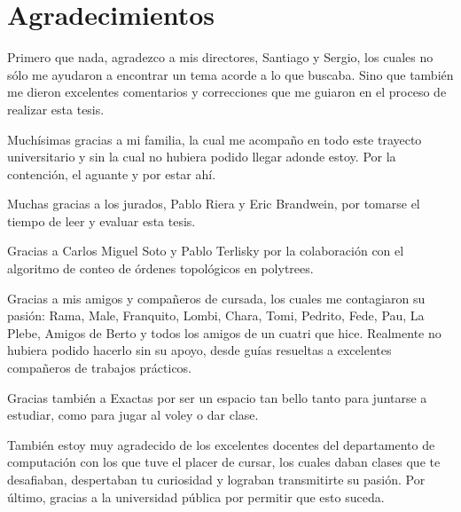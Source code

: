 \section*{Agradecimientos}

Primero que nada, agradezco a mis directores, Santiago y Sergio, los cuales no sólo me ayudaron a encontrar un tema acorde a lo que buscaba. Sino que también me dieron excelentes comentarios y correcciones que me guiaron en el proceso de realizar esta tesis. 

Muchísimas gracias a mi familia, la cual me acompaño en todo este trayecto universitario y sin la cual no hubiera podido llegar adonde estoy. Por la contención, el aguante y por estar ahí.

Muchas gracias a los jurados, Pablo Riera y Eric Brandwein, por tomarse el tiempo de leer y evaluar esta tesis. 

Gracias a Carlos Miguel Soto y Pablo Terlisky por la colaboración con el algoritmo de conteo de órdenes topológicos en polytrees. 

Gracias a mis amigos y compañeros de cursada, los cuales me contagiaron su pasión: Rama, Male, Franquito, Lombi, Chara, Tomi, Pedrito, Fede, Pau, La Plebe, Amigos de Berto y todos los amigos de un cuatri que hice. Realmente no hubiera podido hacerlo sin su apoyo, desde guías resueltas a excelentes compañeros de trabajos prácticos. 

Gracias también a Exactas por ser un espacio tan bello tanto para juntarse a estudiar, como para jugar al voley o dar clase. 

También estoy muy agradecido de los excelentes docentes del departamento de computación con los que tuve el placer de cursar,  los cuales daban clases que te desafiaban, despertaban tu curiosidad y  lograban transmitirte su pasión. Por último, gracias a la universidad pública por permitir que esto suceda. 
    


 